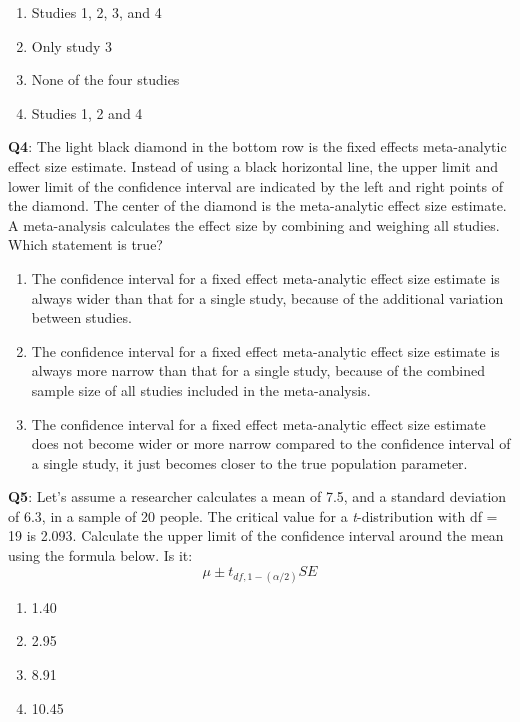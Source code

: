 \documentclass[
  oneside]{krantz}
\providecommand{\tightlist}{%
  \setlength{\itemsep}{0pt}\setlength{\parskip}{0pt}}
\begin{document}
\begin{enumerate}
\def\labelenumi{\Alph{enumi})}
\tightlist
\item
  Studies 1, 2, 3, and 4
\item
  Only study 3
\item
  None of the four studies
\item
  Studies 1, 2 and 4
\end{enumerate}

\textbf{Q4}: The light black diamond in the bottom row is the fixed effects meta-analytic effect size estimate. Instead of using a black horizontal line, the upper limit and lower limit of the confidence interval are indicated by the left and right points of the diamond. The center of the diamond is the meta-analytic effect size estimate. A meta-analysis calculates the effect size by combining and weighing all studies. Which statement is true?

\begin{enumerate}
\def\labelenumi{\Alph{enumi})}
\tightlist
\item
  The confidence interval for a fixed effect meta-analytic effect size estimate is always wider than that for a single study, because of the additional variation between studies.
\item
  The confidence interval for a fixed effect meta-analytic effect size estimate is always more narrow than that for a single study, because of the combined sample size of all studies included in the meta-analysis.
\item
  The confidence interval for a fixed effect meta-analytic effect size estimate does not become wider or more narrow compared to the confidence interval of a single study, it just becomes closer to the true population parameter.
\end{enumerate}

\textbf{Q5}: Let's assume a researcher calculates a mean of 7.5, and a standard deviation of 6.3, in a sample of 20 people. The critical value for a \emph{t}-distribution with df = 19 is 2.093. Calculate the upper limit of the confidence interval around the mean using the formula below. Is it:
\[
\mu \pm t_{df, 1-(\alpha/2)} SE
\]

\begin{enumerate}
\def\labelenumi{\Alph{enumi})}
\tightlist
\item
  1.40
\item
  2.95
\item
  8.91
\item
  10.45
\end{enumerate}
\end{document}

